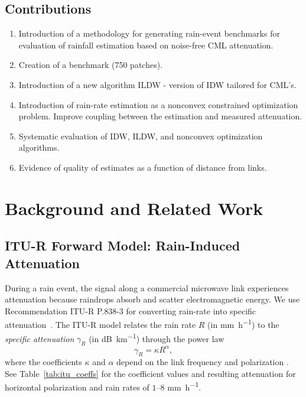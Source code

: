 \documentclass[a4paper,fleqn]{cas-sc}
\newcommand{\notebox}[3]{%
  \begingroup
  \setlength{\fboxsep}{2pt}%
  \fcolorbox{#1}{#2}{\textsf{\footnotesize #3}}%
  \endgroup
}
\DeclareRobustCommand{\editnote}[1]{%
  \texorpdfstring{%
    \nobreak\hfill
    \mbox{\notebox{red!50!black}{red!10}{#1}}%
  }{}%
}
\begin{document}
\subsection{Contributions}
\begin{enumerate}
  \item Introduction of a methodology for generating rain-event benchmarks for evaluation of rainfall estimation based on noise-free CML attenuation.
  \item Creation of a benchmark (750 patches).
  \item Introduction of a new algorithm ILDW - version of IDW tailored for CML's.
  \item Introduction of rain-rate estimation as a nonconvex constrained optimization problem. Improve coupling between the estimation and measured attenuation.
  \item Systematic evaluation of IDW, ILDW, and nonconvex optimization algorithms.
  \item Evidence of quality of estimates as a function of distance from links.

\end{enumerate}
\section{Background and Related Work}
\subsection{ITU-R Forward Model: Rain-Induced Attenuation\editnote{GE:stable}}

During a rain event, the signal along a commercial microwave link experiences attenuation because raindrops absorb and scatter electromagnetic energy.
We use Recommendation ITU-R P.838-3 for converting rain-rate into specific attenuation~\citep{itu}. The ITU-R model relates the rain rate $R$ (in \si{\milli\meter\per\hour})
to the \emph{specific attenuation} $\gamma_R$ (in \si{\deci\bel\per\kilo\meter}) through the power law
\begin{equation}\label{eq:ITU}
  \gamma_R = \kappa R^{\alpha},
\end{equation}
where the coefficients $\kappa$ and $\alpha$ depend on the link frequency and polarization \citep{itu}. See Table~\ref{tab:itu_coeffs} for the coefficient values and resulting attenuation for horizontal polarization and rain rates of $1$--$8$ \si{\milli\meter\per\hour}.
\end{document}
